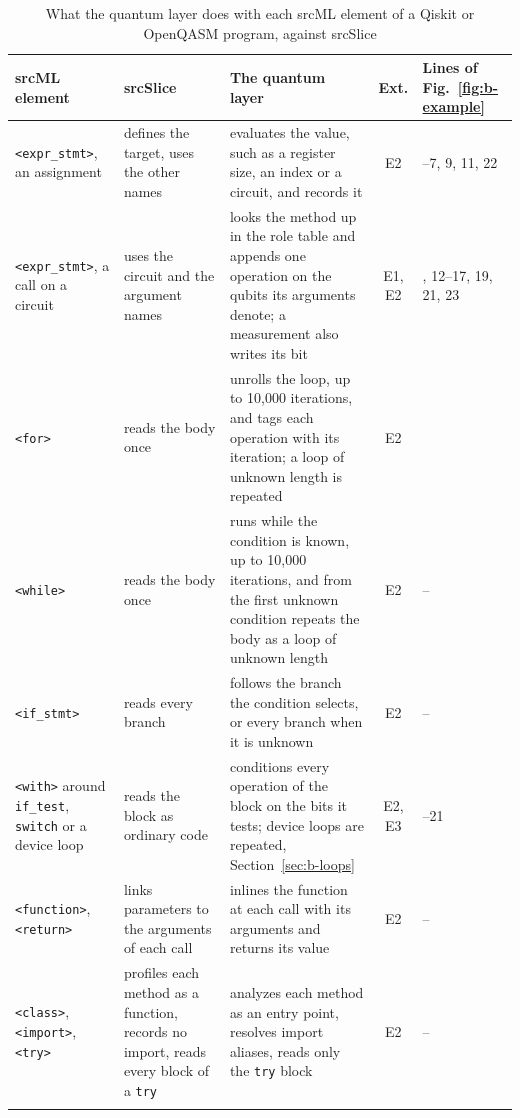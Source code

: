 \begin{table}[t]
  \centering
  \caption{What the quantum layer does with each srcML element of a Qiskit or OpenQASM program, against srcSlice}
  \label{tab:b-layer}
  \footnotesize\setlength{\tabcolsep}{3.4pt}\renewcommand{\arraystretch}{1.05}
  \newcommand{\sep}{\arrayrulecolor{black!25}\hline\arrayrulecolor{black}}
  \begin{tabularx}{\textwidth}{@{}>{\raggedright\arraybackslash}p{3.1cm} >{\raggedright\arraybackslash}p{3.6cm} >{\raggedright\arraybackslash}X c >{\raggedright\arraybackslash}p{1.35cm}@{}}
    \toprule
    \rowcolor{black!8}\textbf{srcML element} & \textbf{srcSlice} & \textbf{The quantum layer} & \textbf{Ext.} & \textbf{Lines of Fig.~\ref{fig:b-example}} \\
    \midrule
    \texttt{<expr\_stmt>}, an assignment & defines the target, uses the other names & evaluates the value, such as a register size, an index or a circuit, and records it & E2 & 3--7, 9, 11, 22 \\ \sep
    \texttt{<expr\_stmt>}, a call on a circuit & uses the circuit and the argument names & looks the method up in the role table and appends one operation on the qubits its arguments denote; a measurement also writes its bit & E1, E2 & 8, 12--17, 19, 21, 23 \\ \sep
    \texttt{<for>} & reads the body once & unrolls the loop, up to 10{,}000 iterations, and tags each operation with its iteration; a loop of unknown length is repeated & E2 & 10 \\ \sep
    \texttt{<while>} & reads the body once & runs while the condition is known, up to 10{,}000 iterations, and from the first unknown condition repeats the body as a loop of unknown length & E2 & -- \\ \sep
    \texttt{<if\_stmt>} & reads every branch & follows the branch the condition selects, or every branch when it is unknown & E2 & -- \\ \sep
    \texttt{<with>} around \texttt{if\_test}, \texttt{switch} or a device loop & reads the block as ordinary code & conditions every operation of the block on the bits it tests; device loops are repeated, Section~\ref{sec:b-loops} & E2, E3 & 18--21 \\ \sep
    \texttt{<function>}, \texttt{<return>} & links parameters to the arguments of each call & inlines the function at each call with its arguments and returns its value & E2 & -- \\ \sep
    \texttt{<class>}, \texttt{<import>}, \texttt{<try>} & profiles each method as a function, records no import, reads every block of a \texttt{try} & analyzes each method as an entry point, resolves import aliases, reads only the \texttt{try} block & E2 & -- \\ \sep

\end{tabularx}
\end{table}
